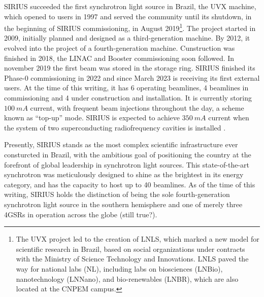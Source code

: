SIRIUS succeeded the first synchrotron light source in Brazil, the UVX machine, which opened to users in 1997 and served the community until its shutdown, in the beginning of SIRIUS commissioning, in August 2019\footnote{The UVX project led to the creation of LNLS, which marked a new model for scientific research in Brazil, based on social organizations under contracts with the Ministry of Science Technology and Innovations. LNLS paved the way for national labs (NL), including labs on biosciences (LNBio), nanotechnology (LNNano), and bio-renewables (LNBR), which are also located at the CNPEM campus.}\cite{liu_synchrotron_2019}. The project started in 2009, initially planned and designed as a third-generation machine. By 2012, it evolved into the project of a fourth-generation machine\cite{liu_synchrotron_2019}. Cunstruction was finished in 2018, the LINAC and Booster commissioning soon followed. In november 2019 the first beam was stored in the storage ring.
SIRIUS finished its Phase-0 commissioning in 2022 and since March 2023 is receiving its first external users. At the time of this writing, it has 6 operating beamlines, 4 beamlines in commissioning and 4 under construction and installation. It is currently storing $100~\unit{mA}$ current, with frequent beam injections throughout the day, a scheme known as ``top-up'' mode. SIRIUS is expected to achieve $350~\unit{mA}$ current when the system of two superconducting radiofrequency cavities is installed \cite{liu_status_2022,liu_status_2023}.

Presently, SIRIUS stands as the most complex scientific infrastructure ever consturcted in Brazil, with the ambitious goal of positioning the country at the forefront of global leadership in synchrotron light sources. This state-of-the-art synchrotron was meticulously designed to shine as the brightest in its energy category, and has the capacity to host up to 40 beamlines. As of the time of this writing, SIRIUS holds the distinction of being the sole fourth-generation synchrotron light source in the southern hemisphere and one of merely three 4GSRs in operation across the globe (still true?).

